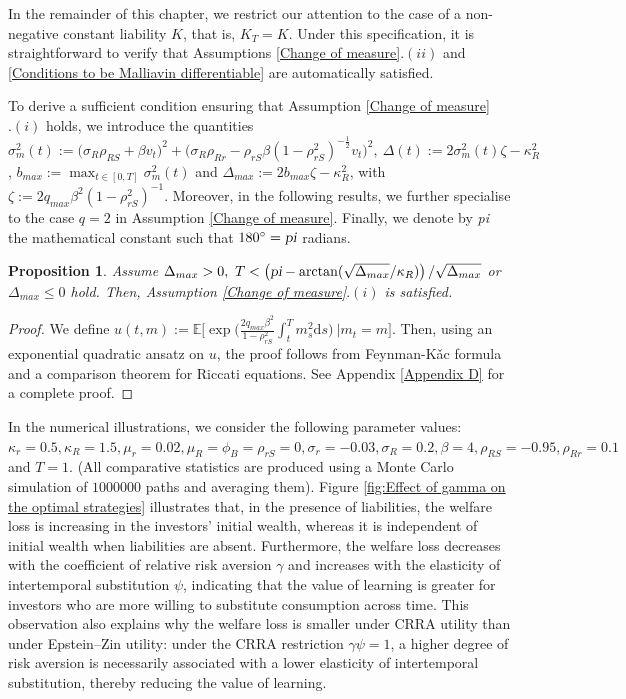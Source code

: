 \documentclass[12,reqno]{amsart}
\numberwithin{equation}{section}
\newtheorem{prop}[defi]{Proposition}
\begin{document}
In the remainder of this chapter, we restrict our attention to the case of a non-negative constant liability $K$, that is, $K_{T}=K$. Under this specification, it is straightforward to verify that Assumptions \ref{Change of measure}$.(ii)$ and \ref{Conditions to be Malliavin differentiable} are automatically satisfied.

To derive a sufficient condition ensuring that Assumption \ref{Change of measure}$.(i)$ holds, we introduce the quantities $\sigma_{m}^{2}(t):=\big(\sigma_{R}\rho_{RS}+\beta v_{t}\big)^{2}+\big(\sigma_{R}\rho_{Rr} -\rho_{rS}\beta(1-\rho_{rS}^{2})^{-\frac{1}{2}}v_{t}\big)^{2},~\Delta(t):=2\sigma_{m}^{2}(t)\zeta-\kappa_{R}^{2}$, $b_{max}:=\max_{t\in[0,T]}\sigma_{m}^{2}(t)$ and $\Delta_{max}:=2b_{max}\zeta-\kappa_{R}^{2}$, with $\zeta:=2q_{max}\beta^{2}(1-\rho_{rS}^{2})^{-1}$. Moreover, in the following results, we further specialise to the case $q=2$ in Assumption \ref{Change of measure}. Finally, we denote by \textsl{pi} the mathematical constant such that $180^{\circ}=\textsl{pi}$ radians.
\begin{prop}\label{Sufficient conditions for the assumptions to hold}
	Assume $\Delta_{max}>0,~T<\left(\textsl{pi}-\arctan(\sqrt{\Delta_{max}}/\kappa_{R})\right)/\sqrt{\Delta_{max}}$ or $\Delta_{max}\le0$ hold. Then, Assumption \ref{Change of measure}$.(i)$ is satisfied.
\end{prop}
\begin{proof}
	We define $u(t,m):=\mathbb{E}\Big[\exp\Big(\frac{2q_{max}\beta^{2}}{1-\rho_{rS}^{2}}\int_{t}^{T}m_{s}^{2}\mathrm{d}s\Big)~\big|m_{t}=m\Big]$. Then, using an exponential quadratic ansatz on $u$, the proof follows from Feynman-K{\v a}c formula and a comparison theorem for Riccati equations. See Appendix \ref{Appendix D} for a complete proof.
\end{proof}
In the numerical illustrations, we consider the following parameter values: $\kappa_{r}=0.5,\kappa_{R}=1.5,\mu_{r}=0.02,\mu_{R}=\phi_{B}=\rho_{rS}=0,\sigma_{r}=-0.03,\sigma_{R}=0.2,\beta=4,\rho_{RS}=-0.95,\rho_{Rr}=0.1$ and $T=1$. (All comparative statistics are produced using a Monte Carlo simulation of $1000000$ paths and averaging them). Figure \ref{fig:Effect of gamma on the optimal strategies} illustrates that, in the presence of liabilities, the welfare loss is increasing in the investors' initial wealth, whereas it is independent of initial wealth when liabilities are absent. Furthermore, the welfare loss decreases with the coefficient of relative risk aversion $\gamma$ and increases with the elasticity of intertemporal substitution $\psi$, indicating that the value of learning is greater for investors who are more willing to substitute consumption across time. This observation also explains why the welfare loss is smaller under CRRA utility than under Epstein--Zin utility: under the CRRA restriction $\gamma\psi=1$, a higher degree of risk aversion is necessarily associated with a lower elasticity of intertemporal substitution, thereby reducing the value of learning.
\end{document}
